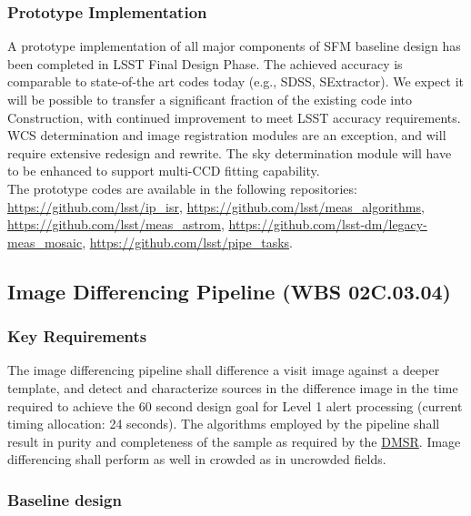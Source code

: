 \documentclass[12pt]{article}
\newcommand{\ds}[2]{{\color{blue} \href{https://docushare.lsstcorp.org/docushare/dsweb/Get/#1}{#2}}\xspace}
\newcommand{\DMSR}{\ds{LSE-61}{DMSR}}
\newcommand{\wbsDiffim}{WBS 02C.03.04}
\begin{document}
\subsubsection{Prototype Implementation}

A prototype implementation of all major components of SFM baseline design has been completed in LSST Final Design Phase. The achieved accuracy is comparable to state-of-the art codes today (e.g., SDSS, SExtractor). We expect it will be possible to transfer a significant fraction of the existing code into Construction, with continued improvement to meet LSST accuracy requirements.
\\

WCS determination and image registration modules are an exception, and will require extensive redesign and rewrite. The sky determination module will have to be enhanced to support multi-CCD fitting capability.
\\

The prototype codes are available in the following repositories: \url{https://github.com/lsst/ip_isr}, \url{https://github.com/lsst/meas_algorithms}, \url{https://github.com/lsst/meas_astrom}, \url{https://github.com/lsst-dm/legacy-meas_mosaic}, \url{https://github.com/lsst/pipe_tasks}.

\clearpage

\subsection{Image Differencing Pipeline (\wbsDiffim)}

\subsubsection{Key Requirements}

The image differencing pipeline shall difference a visit image against a deeper template, and detect and characterize sources in the difference image in the time required to achieve the 60 second design goal for Level 1 alert processing (current timing allocation: 24 seconds). The algorithms employed by the pipeline shall result in purity and completeness of the sample as required by the \DMSR. Image differencing shall perform as well in crowded as in uncrowded fields.

\subsubsection{Baseline design}
\end{document}
